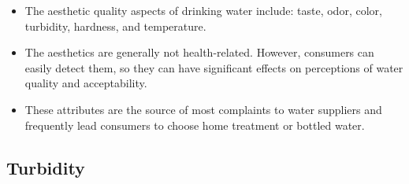 \begin{itemize}
\item The aesthetic quality  aspects of drinking water include: taste, odor, color, turbidity, hardness, and temperature.
\item The aesthetics are generally not health-related. However, consumers can easily detect them, so they can have significant effects on perceptions of water quality and acceptability.
\item These attributes are the source of most complaints to water suppliers and frequently lead consumers to choose home treatment or bottled water.
\end{itemize}
\subsection{Turbidity}
